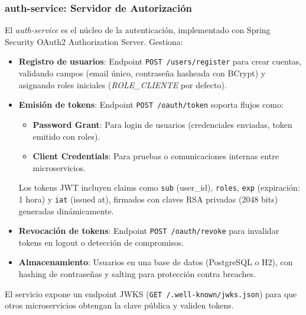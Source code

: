 \documentclass[a4paper,12pt]{article}
\begin{document}
\subsubsection{auth-service: Servidor de Autorización}
El \textit{auth-service} es el núcleo de la autenticación, implementado con Spring Security OAuth2 Authorization Server. Gestiona:
\begin{itemize}
    \item \textbf{Registro de usuarios}: Endpoint \texttt{POST /users/register} para crear cuentas, validando campos (email único, contraseña hasheada con BCrypt) y asignando roles iniciales (\textit{ROLE_CLIENTE} por defecto).
    \item \textbf{Emisión de tokens}: Endpoint \texttt{POST /oauth/token} soporta flujos como:
        \begin{itemize}
            \item \textbf{Password Grant}: Para login de usuarios (credenciales enviadas, token emitido con roles).
            \item \textbf{Client Credentials}: Para pruebas o comunicaciones internas entre microservicios.
        \end{itemize}
        Los tokens JWT incluyen claims como \texttt{sub} (user_id), \texttt{roles}, \texttt{exp} (expiración: 1 hora) y \texttt{iat} (issued at), firmados con claves RSA privadas (2048 bits) generadas dinámicamente.
    \item \textbf{Revocación de tokens}: Endpoint \texttt{POST /oauth/revoke} para invalidar tokens en logout o detección de compromisos.
    \item \textbf{Almacenamiento}: Usuarios en una base de datos (PostgreSQL o H2), con hashing de contraseñas y salting para protección contra breaches.
\end{itemize}
El servicio expone un endpoint JWKS (\texttt{GET /.well-known/jwks.json}) para que otros microservicios obtengan la clave pública y validen tokens.
\end{document}
